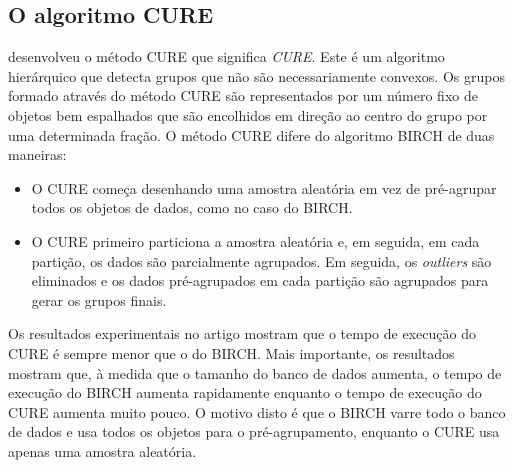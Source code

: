 \begin{figure}[!ht]
	\centering
\end{figure}

\subsection{O algoritmo CURE}
 desenvolveu o método \acrshort{CURE} que significa \textit{\acrlong{CURE}}. Este é um algoritmo hierárquico que detecta grupos que não são necessariamente convexos. Os grupos formado através do método \acrshort{CURE} são representados por um número fixo de objetos bem espalhados que são encolhidos em direção ao centro do grupo por uma determinada fração. O método \acrshort{CURE} difere do algoritmo \acrshort{BIRCH} de duas maneiras:
\begin{itemize}
\item O \acrshort{CURE} começa desenhando uma amostra aleatória em vez de pré-agrupar todos os objetos de dados, como no caso do \acrshort{BIRCH}.
\item O \acrshort{CURE} primeiro particiona a amostra aleatória e, em seguida, em cada partição, os dados são parcialmente agrupados. Em seguida, os \textit{outliers} são eliminados e os dados pré-agrupados em cada partição são agrupados para gerar os grupos finais.
\end{itemize}
Os resultados experimentais no artigo mostram que o tempo de execução do \acrshort{CURE} é sempre menor que o do \acrshort{BIRCH}. Mais importante, os resultados mostram que, à medida que o tamanho do banco de dados aumenta, o tempo de execução do \acrshort{BIRCH} aumenta rapidamente enquanto o tempo de execução do \acrshort{CURE} aumenta muito pouco. O motivo disto é que o \acrshort{BIRCH} varre todo o banco de dados e usa todos os objetos para o pré-agrupamento, enquanto o \acrshort{CURE} usa apenas uma amostra aleatória.

